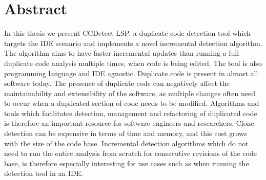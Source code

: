 \chapter*{Abstract}

In this thesis we present CCDetect-LSP, a duplicate code detection tool which targets the
IDE scenario and implements a novel incremental detection algorithm. The algorithm aims to
have faster incremental updates than running a full duplicate code analysis multiple
times, when code is being edited. The tool is also programming language and IDE agnostic.
Duplicate code is present in almost all software today. The presence of duplicate code can
negatively affect the maintainability and extensibility of the software, as multiple
changes often need to occur when a duplicated section of code needs to be modified.
Algorithms and tools which facilitates detection, management and refactoring of duplicated
code is therefore an important resource for software engineers and researchers. Clone
detection can be expensive in terms of time and memory, and this cost grows with the size
of the code base. Incremental detection algorithms which do not need to run the entire
analysis from scratch for consecutive revisions of the code base, is therefore especially
interesting for use cases such as when running the detection tool in an IDE.
